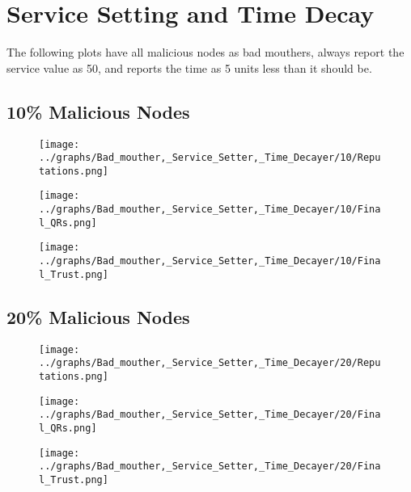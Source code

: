 \documentclass{article}
\begin{document}
    \section*{Service Setting and Time Decay}
    The following plots have all malicious nodes as bad mouthers, always
    report the service value as 50, and reports the time as 5 units less than
    it should be.
    \\
  \begin{minipage}[t]{0.49\columnwidth}
    \subsection*{10\% Malicious Nodes}
        \begin{figure}[H]
            \centering
            \texttt{[image: ../graphs/Bad\_mouther,\_Service\_Setter,\_Time\_Decayer/10/Reputations.png]}
        \end{figure}
        \begin{figure}[H]
            \centering
            \texttt{[image: ../graphs/Bad\_mouther,\_Service\_Setter,\_Time\_Decayer/10/Final\_QRs.png]}
        \end{figure}
    \end{minipage}
    \begin{minipage}[t]{0.49\columnwidth}
        \begin{figure}[H]
            \centering
            \texttt{[image: ../graphs/Bad\_mouther,\_Service\_Setter,\_Time\_Decayer/10/Final\_Trust.png]}
        \end{figure}
    \end{minipage}

  \begin{minipage}[t]{0.49\columnwidth}
    \subsection*{20\% Malicious Nodes}
        \begin{figure}[H]
            \centering
            \texttt{[image: ../graphs/Bad\_mouther,\_Service\_Setter,\_Time\_Decayer/20/Reputations.png]}
        \end{figure}
        \begin{figure}[H]
            \centering
            \texttt{[image: ../graphs/Bad\_mouther,\_Service\_Setter,\_Time\_Decayer/20/Final\_QRs.png]}
        \end{figure}
    \end{minipage}
    \begin{minipage}[t]{0.49\columnwidth}
        \begin{figure}[H]
            \centering
            \texttt{[image: ../graphs/Bad\_mouther,\_Service\_Setter,\_Time\_Decayer/20/Final\_Trust.png]}
        \end{figure}
    \end{minipage}
\end{document}
